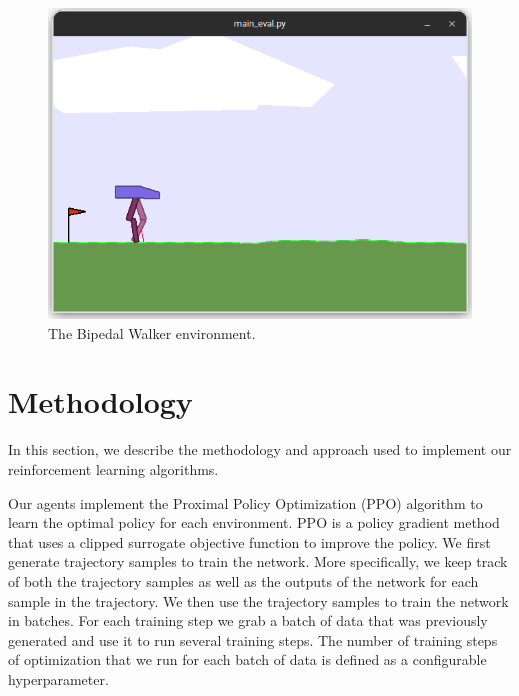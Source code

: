 \begin{figure}[htbp]
    \centerline{\includegraphics[width=\columnwidth]{./img/bipedal-walker-env.png}}
    \caption{The Bipedal Walker environment.}
    \label{bipedal-walker-env}
\end{figure}

\section{Methodology}
\label{sec:methodology}

In this section, we describe the methodology and approach used to implement our reinforcement learning algorithms.

Our agents implement the Proximal Policy Optimization (PPO) algorithm to learn the optimal policy for each environment.
PPO is a policy gradient method that uses a clipped surrogate objective function to improve the policy.
We first generate trajectory samples to train the network.
More specifically, we keep track of both the trajectory samples as well as the outputs of the network for each sample in the trajectory.
We then use the trajectory samples to train the network in batches.
For each training step we grab a batch of data that was previously generated and use it to run several training steps.
The number of training steps of optimization that we run for each batch of data is defined as a configurable hyperparameter.

